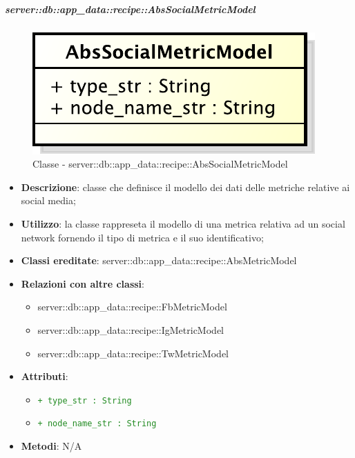 		\subparagraph{server::db::app\_data::recipe::AbsSocialMetricModel} %
		\label{subp:server_db_app_data_recipe_abssocialmetricmodel}
			\begin{figure}[htbp]
				\centering
				\centerline{\includegraphics[scale=0.75]{./images/server/classes/db/abs_social_metric_model.pdf}}
				\caption{Classe - server::db::app\_data::recipe::AbsSocialMetricModel}
			\end{figure}
			\begin{itemize}
				\item \textbf{Descrizione}: classe che definisce il modello dei dati delle metriche relative ai social media;
				\item \textbf{Utilizzo}: la classe rappreseta il modello di una metrica relativa ad un social network fornendo il tipo di metrica e il suo identificativo;
				\item \textbf{Classi ereditate}: server::db::app\_data::recipe::AbsMetricModel
				\item \textbf{Relazioni con altre classi}:
					\begin{itemize}
						\item server::db::app\_data::recipe::FbMetricModel
						\item server::db::app\_data::recipe::IgMetricModel
						\item server::db::app\_data::recipe::TwMetricModel
					\end{itemize}
				\item \textbf{Attributi}:
					\begin{itemize}
						\item \textcolor{forestgreen}{\texttt{+ type\_str : String}}
						\item \textcolor{forestgreen}{\texttt{+ node\_name\_str : String}}
					\end{itemize}
				\item \textbf{Metodi}: N/A
			\end{itemize}


